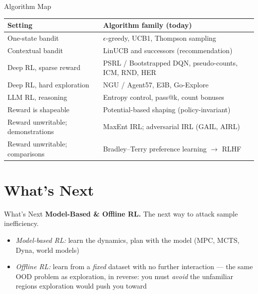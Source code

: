 \begin{frame}{Algorithm Map}
\begin{center}
\renewcommand{\arraystretch}{1.3}
\footnotesize
\begin{tabular}{p{}p{}}
\hline
\textbf{Setting} & \textbf{Algorithm family (today)} \\
\hline
One-state bandit                          & $\epsilon$-greedy, UCB1, Thompson sampling \\
Contextual bandit                         & LinUCB and successors (recommendation) \\
Deep RL, sparse reward                    & PSRL / Bootstrapped DQN, pseudo-counts, ICM, RND, HER \\
Deep RL, hard exploration                 & NGU / Agent57, E3B, Go-Explore \\
LLM RL, reasoning                         & Entropy control, pass@k, count bonuses \\
Reward is shapeable                       & Potential-based shaping (policy-invariant) \\
Reward unwritable; demonstrations         & MaxEnt IRL; adversarial IRL (GAIL, AIRL) \\
Reward unwritable; comparisons            & Bradley--Terry preference learning $\to$ RLHF \\
\hline
\end{tabular}
\end{center}
\end{frame}

\section{What's Next}
\begin{frame}[t]{What's Next}
\vspace{0.4em}
\textbf{Model-Based \& Offline RL.} The next way to attack sample inefficiency.
\vspace{0.5em}
\begin{itemize}
    \setlength{\itemsep}{0.55em}
    \item \emph{Model-based RL:} learn the dynamics, plan with the model (MPC, MCTS, Dyna, world models)
    \item \emph{Offline RL:} learn from a \emph{fixed} dataset with no further interaction --- the same OOD problem as exploration, in reverse: you must \emph{avoid} the unfamiliar regions exploration would push you toward
\end{itemize}
\end{frame}

